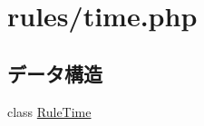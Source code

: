 \hypertarget{time_8php}{
\section{rules/time.php}
\label{time_8php}
}
\subsection*{データ構造}
\begin{DoxyCompactItemize}
\item 
class \hyperlink{class_rule_time}{\-Rule\-Time}
\end{DoxyCompactItemize}
